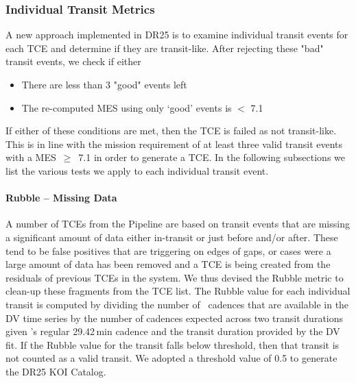 \subsubsection{Individual Transit Metrics}
\label{s:indivtrans}
A new approach implemented in DR25 is to examine individual transit events for each TCE and determine if they are transit-like. After rejecting these "bad" transit events, we check if either

\begin{itemize}
\item There are less than 3 "good" events left
\item The re-computed MES using only `good' events is $<$ 7.1
\end{itemize}

\noindent If either of these conditions are met, then the TCE is failed as not transit-like. This is in line with the \kepler{} mission requirement of at least three valid transit events with a MES~$\ge$~7.1 in order to generate a TCE. In the following subsections we list the various tests we apply to each individual transit event.


\paragraph{Rubble -- Missing Data}
\label{s:rubble}
A number of TCEs from the \kepler{} Pipeline are based on transit events that are missing a significant amount of data either in-transit or just before and/or after. These tend to be false positives that are triggering on edges of gaps, or cases were a large amount of data has been removed and a TCE is being created from the residuals of previous TCEs in the system. We thus devised the Rubble metric to clean-up these fragments from the TCE list. The Rubble value for each individual transit is computed by dividing the number of \Kepler\ cadences that are available in the DV time series by the number of cadences expected across two transit durations given \Kepler's regular 29.42\,min cadence and the transit duration provided by the DV fit. If the Rubble value for the transit falls below threshold, then that transit is not counted as a valid transit. We adopted a threshold value of 0.5 to generate the DR25 KOI Catalog.


